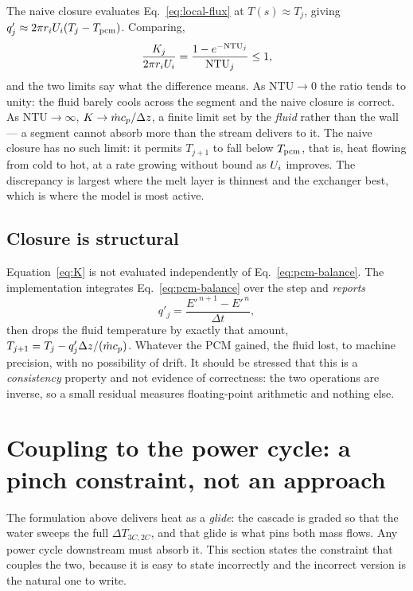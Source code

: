 The naive closure evaluates Eq.~\eqref{eq:local-flux} at $T(s)\approx T_{j}$,
giving $q'_{j}\approx 2\pi r_{i}U_{i}(T_{j}-T_{\mathrm{pcm}})$. Comparing,
\begin{equation}
  \frac{K_{j}}{2\pi r_{i}U_{i}}
  = \frac{1-e^{-\mathrm{NTU}_{j}}}{\mathrm{NTU}_{j}} \le 1,
  \label{eq:K-ratio}
\end{equation}
and the two limits say what the difference means. As $\mathrm{NTU}\to0$ the
ratio tends to unity: the fluid barely cools across the segment and the naive
closure is correct. As $\mathrm{NTU}\to\infty$, $K\to\dot m c_{p}/\Delta z$, a
finite limit set by the \emph{fluid} rather than the wall --- a segment cannot
absorb more than the stream delivers to it. The naive closure has no such limit:
it permits $T_{j+1}$ to fall below $T_{\mathrm{pcm}}$, that is, heat flowing from cold to
hot, at a rate growing without bound as $U_{i}$ improves. The discrepancy is
largest where the melt layer is thinnest and the exchanger best, which is where
the model is most active.

\subsection{Closure is structural}

Equation~\eqref{eq:K} is not evaluated independently of
Eq.~\eqref{eq:pcm-balance}. The implementation integrates
Eq.~\eqref{eq:pcm-balance} over the step and \emph{reports}
\begin{equation}
  q'_{j} = \frac{E'^{\,n+1}-E'^{\,n}}{\Delta t},
  \label{eq:qfromE}
\end{equation}
then drops the fluid temperature by exactly that amount,
$T_{j+1}=T_{j}-q'_{j}\Delta z/(\dot m c_{p})$. Whatever the PCM gained, the fluid
lost, to machine precision, with no possibility of drift. It should be stressed
that this is a \emph{consistency} property and not evidence of correctness: the
two operations are inverse, so a small residual measures floating-point
arithmetic and nothing else.

\section{Coupling to the power cycle: a pinch constraint, not an approach}
\label{sec:pinch}

The formulation above delivers heat as a \emph{glide}: the cascade is graded so
that the water sweeps the full $\Delta T_{3C,2C}$, and that glide is what pins
both mass flows. Any power cycle downstream must absorb it. This section states
the constraint that couples the two, because it is easy to state incorrectly and
the incorrect version is the natural one to write.

